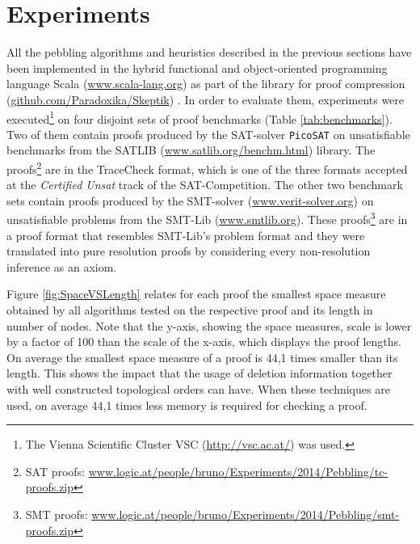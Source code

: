 \documentclass{llncs}
\begin{document}
\section{Experiments} 
\label{sec:exp}


All the pebbling algorithms and heuristics described in the previous sections have been implemented in the hybrid functional and object-oriented programming
language Scala (\url{www.scala-lang.org}) as part of the \skeptik library for proof compression (\url{github.com/Paradoxika/Skeptik}) \cite{Skeptik}.
In order to evaluate them, experiments were executed\footnote{The Vienna Scientific Cluster VSC 
(\url{http://vsc.ac.at/}) was used.} on four disjoint sets of proof benchmarks (Table \ref{tab:benchmarks}). Two of them contain proofs produced by the SAT-solver \texttt{PicoSAT} \cite{Biere_picosatessentials} on unsatisfiable benchmarks from the SATLIB (\url{www.satlib.org/benchm.html}) library. The proofs\footnote{SAT proofs: \url{www.logic.at/people/bruno/Experiments/2014/Pebbling/tc-proofs.zip}} are in the TraceCheck format, which is one of the three formats accepted at the \emph{Certified Unsat} track of the SAT-Competition.
The other two benchmark sets contain proofs produced by the SMT-solver {\veriT} (\url{www.verit-solver.org}) 
on unsatisfiable problems from the SMT-Lib (\url{www.smtlib.org}). These proofs\footnote{SMT proofs: \url{www.logic.at/people/bruno/Experiments/2014/Pebbling/smt-proofs.zip}} are in a proof format that resembles SMT-Lib's problem format and they were translated into pure resolution proofs by considering every non-resolution inference as an axiom.

Figure \ref{fig:SpaceVSLength} relates for each proof the smallest space measure obtained by all algorithms tested on the respective proof and its length in number of nodes. Note that the y-axis, showing the space measures, scale is lower by a factor of 100 than the scale of the x-axis, which displays the proof lengths. On average the smallest space measure of a proof is 44,1 times smaller than its length. This shows the impact that the usage of deletion information together with well constructed topological orders can have. When these techniques are used, on average 44,1 times less memory is required for checking a proof.
\end{document}
